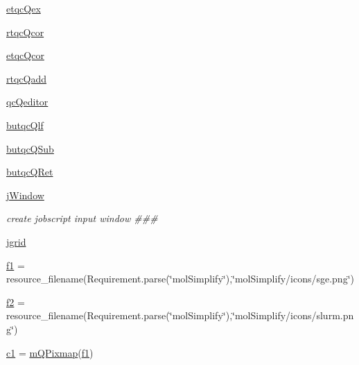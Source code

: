 \begin{DoxyCompactItemize}
\item 
\hyperlink{classmolSimplify_1_1Classes_1_1mGUI_1_1mGUI_a460a40b62b0fabec4e8838ae4e5e31fe}{etqc\+Qex}
\item 
\hyperlink{classmolSimplify_1_1Classes_1_1mGUI_1_1mGUI_abedb757b46e333af4e43141aefa9fde9}{rtqc\+Qcor}
\item 
\hyperlink{classmolSimplify_1_1Classes_1_1mGUI_1_1mGUI_adf79140d824884250765516600698d10}{etqc\+Qcor}
\item 
\hyperlink{classmolSimplify_1_1Classes_1_1mGUI_1_1mGUI_a9e498447151a5eb694349c714ee452be}{rtqc\+Qadd}
\item 
\hyperlink{classmolSimplify_1_1Classes_1_1mGUI_1_1mGUI_aee649187177afee89e227341ec0bf0b8}{qc\+Qeditor}
\item 
\hyperlink{classmolSimplify_1_1Classes_1_1mGUI_1_1mGUI_aa47a49b686ff960ead8e6c0af0ef651e}{butqc\+Qlf}
\item 
\hyperlink{classmolSimplify_1_1Classes_1_1mGUI_1_1mGUI_abf294dd62d400c95fd1a683c0e8bd9a5}{butqc\+Q\+Sub}
\item 
\hyperlink{classmolSimplify_1_1Classes_1_1mGUI_1_1mGUI_a3f7da3c3bb924e4db825046d3634e9bb}{butqc\+Q\+Ret}
\item 
\hyperlink{classmolSimplify_1_1Classes_1_1mGUI_1_1mGUI_af571cc59baf2eb83fd6aa7766b36bb5a}{j\+Window}
\begin{DoxyCompactList}\small\item\em create jobscript input window \#\#\# \end{DoxyCompactList}\item 
\hyperlink{classmolSimplify_1_1Classes_1_1mGUI_1_1mGUI_a0a30ca55f607558ec3347d98efc2b3cc}{jgrid}
\item 
\hyperlink{classmolSimplify_1_1Classes_1_1mGUI_1_1mGUI_a89fc6d12f121c99752781d8ea72d8e4f}{f1} = resource\+\_\+filename(Requirement.\+parse(\char`\"{}mol\+Simplify\char`\"{}),\char`\"{}mol\+Simplify/icons/sge.\+png\char`\"{})
\item 
\hyperlink{classmolSimplify_1_1Classes_1_1mGUI_1_1mGUI_af77082752452dc5042f2a949089c0ec6}{f2} = resource\+\_\+filename(Requirement.\+parse(\char`\"{}mol\+Simplify\char`\"{}),\char`\"{}mol\+Simplify/icons/slurm.\+png\char`\"{})
\item 
\hyperlink{classmolSimplify_1_1Classes_1_1mGUI_1_1mGUI_a718c4719eb662ac9dba5541cdf1ecd3e}{c1} = \hyperlink{classmolSimplify_1_1Classes_1_1mWidgets_1_1mQPixmap}{m\+Q\+Pixmap}(\hyperlink{classmolSimplify_1_1Classes_1_1mGUI_1_1mGUI_a89fc6d12f121c99752781d8ea72d8e4f}{f1})
\item 

\end{DoxyCompactItemize}
